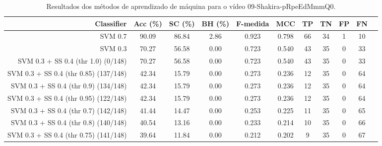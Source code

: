 \begin{table}[!htb]
\centering
\caption{Resultados dos métodos de aprendizado de máquina para o vídeo 09-Shakira-pRpeEdMmmQ0.}
\label{tab:09-Shakira-pRpeEdMmmQ0}
\begin{tabular}{r|c|c|c|c|c|c|c|c|c|c}
\hline\hline
Classifier & Acc (\%) & SC (\%) & BH (\%) & F-medida & MCC & TP & TN & FP & FN \\ \hline
SVM 0.7 & 90.09 & 86.84 & 2.86 & 0.923 & 0.798 & 66 & 34 & 1 & 10 \\ 
SVM 0.3 & 70.27 & 56.58 & 0.00 & 0.723 & 0.540 & 43 & 35 & 0 & 33 \\ 
SVM 0.3 + SS 0.4 (thr 1.0) (0/148) & 70.27 & 56.58 & 0.00 & 0.723 & 0.540 & 43 & 35 & 0 & 33 \\ 
SVM 0.3 + SS 0.4 (thr 0.85) (137/148) & 42.34 & 15.79 & 0.00 & 0.273 & 0.236 & 12 & 35 & 0 & 64 \\ 
SVM 0.3 + SS 0.4 (thr 0.9) (134/148) & 42.34 & 15.79 & 0.00 & 0.273 & 0.236 & 12 & 35 & 0 & 64 \\ 
SVM 0.3 + SS 0.4 (thr 0.95) (122/148) & 42.34 & 15.79 & 0.00 & 0.273 & 0.236 & 12 & 35 & 0 & 64 \\ 
SVM 0.3 + SS 0.4 (thr 0.7) (142/148) & 41.44 & 14.47 & 0.00 & 0.253 & 0.225 & 11 & 35 & 0 & 65 \\ 
SVM 0.3 + SS 0.4 (thr 0.8) (140/148) & 40.54 & 13.16 & 0.00 & 0.233 & 0.214 & 10 & 35 & 0 & 66 \\ 
SVM 0.3 + SS 0.4 (thr 0.75) (141/148) & 39.64 & 11.84 & 0.00 & 0.212 & 0.202 & 9 & 35 & 0 & 67 \\ 
\hline\hline
\end{tabular}
\end{table}
